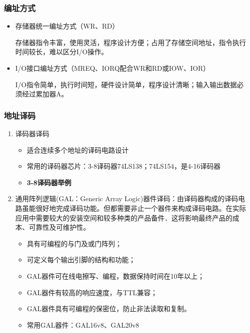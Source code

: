 \subsubsection{编址方式}

\begin{itemize}
  \item 存储器统一编址方式（WR、RD）

存储器指令丰富，使用灵活，程序设计方便；占用了存储空间地址，指令执行时间较长，难以区分I/O操作。

  \item I/O接口编址方式（MREQ、IORQ配合WR和RD或IOW、IOR）

I/O指令简单，执行时间短，硬件设计简单，程序设计清晰；输入输出数据必须经过累加器A。

\end{itemize}



\subsubsection{地址译码}

\begin{enumerate}
  \item 译码器译码
  \begin{itemize}
    \item 适合连续多个地址的译码电路设计
    \item 常用的译码器芯片：3-8译码器74LS138；74LS154，是4-16译码器


    \item \textbf{3-8译码器举例}
  \end{itemize}



  \item 通用阵列逻辑(GAL：Generic Array Logic)器件译码：由译码器构成的译码电路虽能很好地完成译码功能。但都需要非止一个器件来构成译码电路。在实际应用中需要较大的安装空间和较多种类的产品备件．这将影响最终产品的成本、可靠性及可维护性。
\begin{itemize}
  \item 具有可编程的与门及或门阵列；
  \item 可定义每个输出引脚的结构和功能；
  \item GAL器件可在线电擦写、编程，数据保持时间在10年以上；
  \item GAL器件有较高的响应速度，与TTL兼容；
  \item GAL器件具有可编程的保密位，防止非法读取和复制。
  \item 常用GAL器件：GAL16v8、GAL20v8

\end{itemize}

\end{enumerate}


